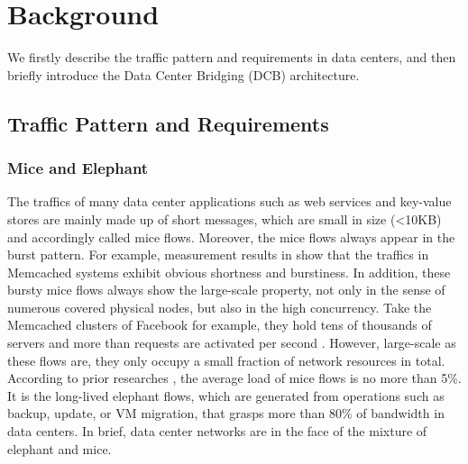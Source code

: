 \documentclass[]{sig-alternate-10pt}
\begin{document}
 \section{Background}
\label{background}

We firstly describe the traffic pattern and requirements in data centers, and then briefly introduce the Data Center Bridging (DCB) architecture.


\subsection{Traffic Pattern and Requirements}

\subsubsection{Mice and Elephant}
The traffics of many data center applications such as web services and key-value stores are mainly made up of short messages, which are small in size (<10KB) and accordingly called mice flows. Moreover, the mice flows always appear in the burst pattern.
For example, measurement results in \cite{atikoglu2012workload} show that the traffics in Memcached systems exhibit obvious shortness and burstiness.
In addition, these bursty mice flows always show the large-scale property, not only in the sense of numerous covered physical nodes, but also in the high concurrency.
Take the Memcached clusters of Facebook for example, they hold tens of thousands of servers and more than  requests are activated per second \cite{nishtala2013scaling}.
However, large-scale as these flows are, they only occupy a small fraction of network resources in total. According to prior researches \cite{alizadeh2011data, benson2010network, gill2011understanding}, the average load of mice flows is no more than 5\%. It is the long-lived elephant flows, which are generated from operations such as backup, update, or VM migration, that grasps more than 80\% of bandwidth in data centers.
In brief, data center networks are in the face of the mixture of elephant and mice.
\end{document}
